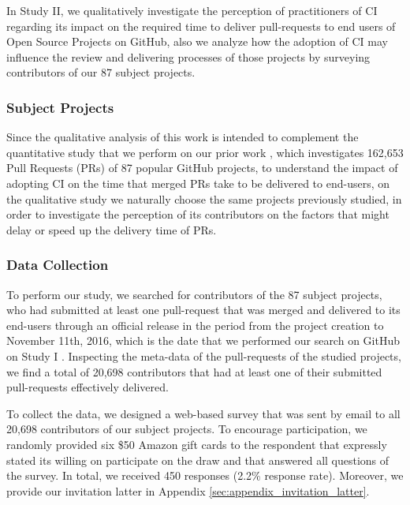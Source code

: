 	In Study II, we qualitatively investigate the perception of practitioners of CI regarding its impact on the required time to deliver pull-requests to end users of Open Source Projects on GitHub, also we analyze how the adoption of CI may influence the review and delivering processes of those projects by surveying contributors of our 87 subject projects.
	
	\subsubsection{Subject Projects}
	\label{sec:subject_projects}
	
	Since the qualitative analysis of this work is intended to complement the quantitative study that we perform on our prior work \cite{bernardo2018studying} , which investigates 162,653 Pull Requests (PRs) of 87 popular GitHub projects, to understand the impact of adopting CI on the time that merged PRs take to be delivered to end-users, on the qualitative study we naturally choose the same projects previously studied, in order to investigate the perception of its contributors on the factors that might delay or speed up the delivery time of PRs.
	
	\subsubsection{Data Collection}
	\label{sec:data_collection}
	
	To perform our study, we searched for contributors of the 87 subject projects, who had submitted at least one pull-request that was merged and delivered to its end-users through an official release in the period from the project creation to November 11th, 2016, which is the date that we performed our search on GitHub on Study I \cite{bernardo2018studying}. Inspecting the meta-data of the pull-requests of the studied projects, we find a total of 20,698 contributors that had at least one of their submitted pull-requests effectively delivered. 
	
	To collect the data, we designed a web-based survey that was sent by email to all 20,698 contributors of our subject projects. To encourage participation, we randomly provided six \$50 Amazon gift cards to the respondent that expressly stated its willing on participate on the draw and that answered all questions of the survey. In total, we received 450 responses (2.2\% response rate). Moreover, we provide our invitation latter in Appendix \ref{sec:appendix_invitation_latter}.
	
